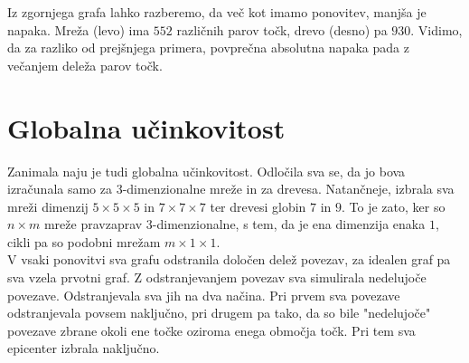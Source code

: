 \documentclass[a4paper, 16pt]{article}
\begin{document}
    Iz zgornjega grafa lahko razberemo, da več kot imamo ponovitev, manjša je napaka. Mreža (levo) ima $552$ različnih parov točk, drevo (desno) pa $930$.
    Vidimo, da za razliko od prejšnjega primera, povprečna absolutna napaka pada z večanjem deleža parov točk.

\newpage    


    


\section{Globalna učinkovitost}

Zanimala naju je tudi globalna učinkovitost. Odločila sva se, da jo bova izračunala samo za 3-dimenzionalne mreže in za drevesa. Natančneje, izbrala sva mreži dimenzij $5 \times 5 \times 5$ in $7 \times 7 \times 7$
ter drevesi globin $7$ in $9$.
To je zato, ker so $n \times m$ mreže pravzaprav 3-dimenzionalne, s tem, da je ena dimenzija enaka $1$, cikli pa so podobni mrežam $m \times 1 \times 1$.\\
V vsaki ponovitvi sva grafu odstranila določen delež povezav, za idealen graf pa sva vzela prvotni graf. Z odstranjevanjem povezav sva simulirala nedelujoče povezave. 
Odstranjevala sva jih na dva načina. Pri prvem sva povezave odstranjevala povsem naključno, pri drugem pa tako, da so bile "nedelujoče" povezave zbrane okoli ene točke oziroma enega območja točk.
Pri tem sva epicenter izbrala naključno. \\
\end{document}
